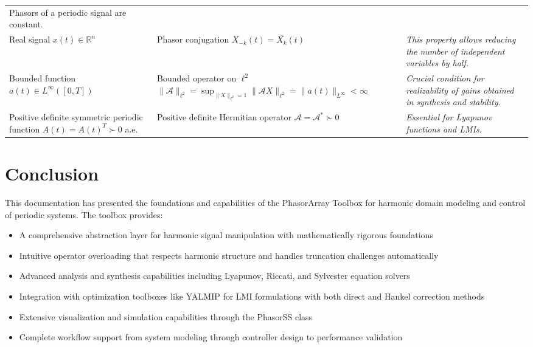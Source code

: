 \documentclass[11pt,a4paper]{article}
\begin{document}
\begin{table}[!ht]
\begin{tabularx}{0.98\textwidth}{>{\raggedright\arraybackslash}X >{\raggedright\arraybackslash}X >{\raggedright\itshape\small\arraybackslash}X}
        Phasors of a periodic signal are constant. \\
        \addlinespace
        Real signal \newline $x(t) \in \mathbb{R}^n$ &
        Phasor conjugation \newline $X_{-k}(t) = \overline{X_k}(t)$ &
        This property allows reducing the number of independent variables by half. \\
        \addlinespace
        Bounded function \newline $a(t) \in L^\infty([0,T])$ &
        Bounded operator on $\ell^2$ \newline $\| \mathcal{A} \|_{\ell^2} = \sup_{\| X \|_{\ell^2}=1} \| \mathcal{A}X \|_{\ell^2} = \| a(t) \|_{L^\infty} < \infty$ &
        Crucial condition for realizability of gains obtained in synthesis and stability. \\
        \addlinespace
        Positive definite symmetric periodic function \newline $A(t) = A(t)^T \succ 0$ a.e. &
        Positive definite Hermitian operator \newline $\mathcal{A} = \mathcal{A}^* \succ 0$ &
        Essential for Lyapunov functions and LMIs. \\
        \bottomrule
    \end{tabularx}
\end{table}

\section{Conclusion}

This documentation has presented the foundations and capabilities of the PhasorArray Toolbox for harmonic domain modeling and control of periodic systems. The toolbox provides:

\begin{itemize}
    \item A comprehensive abstraction layer for harmonic signal manipulation with mathematically rigorous foundations
    \item Intuitive operator overloading that respects harmonic structure and handles truncation challenges automatically
    \item Advanced analysis and synthesis capabilities including Lyapunov, Riccati, and Sylvester equation solvers
    \item Integration with optimization toolboxes like YALMIP for LMI formulations with both direct and Hankel correction methods
    \item Extensive visualization and simulation capabilities through the PhasorSS class
    \item Complete workflow support from system modeling through controller design to performance validation
\end{itemize}
\end{document}
